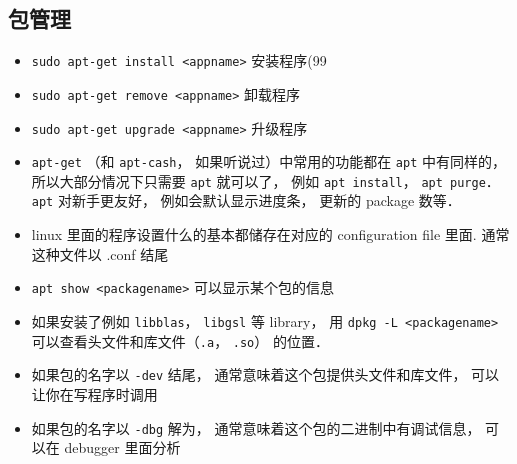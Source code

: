 \subsection{包管理}
\begin{itemize}
\item \verb`sudo apt-get install <appname>` 安装程序(99%
\item \verb`sudo apt-get remove <appname>` 卸载程序
\item \verb`sudo apt-get upgrade <appname>` 升级程序
\item \verb`apt-get` （和 \verb`apt-cash`， 如果听说过）中常用的功能都在 \verb`apt` 中有同样的， 所以大部分情况下只需要 \verb`apt` 就可以了， 例如 \verb`apt install`， \verb`apt purge`． \verb`apt` 对新手更友好， 例如会默认显示进度条， 更新的 package 数等．
\item linux 里面的程序设置什么的基本都储存在对应的 configuration file 里面. 通常这种文件以 .conf 结尾
\item \verb`apt show <packagename>` 可以显示某个包的信息
\item 如果安装了例如 \verb`libblas`， \verb`libgsl` 等 library， 用 \verb`dpkg -L <packagename>` 可以查看头文件和库文件（\verb`.a`， \verb`.so`） 的位置．
\item 如果包的名字以 \verb`-dev` 结尾， 通常意味着这个包提供头文件和库文件， 可以让你在写程序时调用
\item 如果包的名字以 \verb`-dbg` 解为， 通常意味着这个包的二进制中有调试信息， 可以在 debugger 里面分析
\end{itemize}

